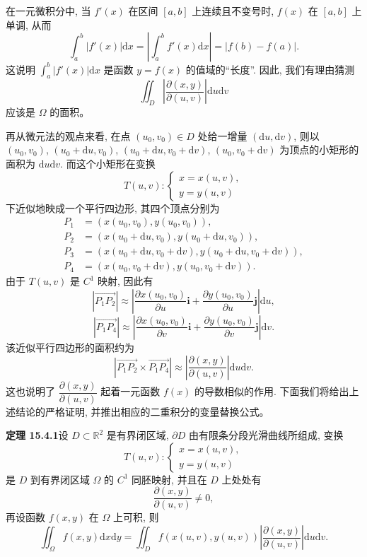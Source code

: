 \documentclass[UTF8, 12pt, fontset=fandol, oneside]{ctexart}
\begin{document}
在一元微积分中, 当 $f'(x)$ 在区间 $[a,b]$ 上连续且不变号时, $f(x)$ 在 $[a,b]$ 上单调, 从而
\[
  \int_a^b|f'(x)|\mathrm dx
  =\left|\int_a^bf'(x)\mathrm dx\right|
  =|f(b)-f(a)|.
\]
这说明 $\int_a^b|f'(x)|\mathrm dx$ 是函数 $y=f(x)$ 的值域的“长度”. 因此, 我们有理由猜测
\[
  \iint_D\left|\frac{\partial(x,y)}{\partial(u,v)}\right|\mathrm du\mathrm dv
\]
应该是 $\Omega$ 的面积。

再从微元法的观点来看, 在点 $(u_0,v_0)\in D$ 处给一增量 $(\mathrm du,\mathrm dv)$, 则以 $(u_0,v_0)$, $(u_0+\mathrm du,v_0)$, $(u_0+\mathrm du,v_0+\mathrm dv)$, $(u_0,v_0+\mathrm dv)$ 为顶点的小矩形的面积为 $\mathrm du\mathrm dv$. 而这个小矩形在变换
\[
  T(u,v):
  \begin{cases}
    x=x(u,v),\\
    y=y(u,v)
  \end{cases}
\]
下近似地映成一个平行四边形, 其四个顶点分别为
\[
\begin{aligned}
  P_1&=(x(u_0,v_0),y(u_0,v_0)),\\
  P_2&=(x(u_0+\mathrm du,v_0),y(u_0+\mathrm du,v_0)),\\
  P_3&=(x(u_0+\mathrm du,v_0+\mathrm dv),y(u_0+\mathrm du,v_0+\mathrm dv)),\\
  P_4&=(x(u_0,v_0+\mathrm dv),y(u_0,v_0+\mathrm dv)).
\end{aligned}
\]
由于 $T(u,v)$ 是 $C^1$ 映射, 因此有
\[
  |\overrightarrow{P_1P_2}|\approx
  \left|\frac{\partial x(u_0,v_0)}{\partial u}\boldsymbol i
  +\frac{\partial y(u_0,v_0)}{\partial u}\boldsymbol j\right|\mathrm du,
\]
\[
  |\overrightarrow{P_1P_4}|\approx
  \left|\frac{\partial x(u_0,v_0)}{\partial v}\boldsymbol i
  +\frac{\partial y(u_0,v_0)}{\partial v}\boldsymbol j\right|\mathrm dv.
\]
该近似平行四边形的面积约为
\[
  |\overrightarrow{P_1P_2}\times\overrightarrow{P_1P_4}|
  \approx
  \left|\frac{\partial(x,y)}{\partial(u,v)}\right|\mathrm du\mathrm dv.
\]
这也说明了 $\dfrac{\partial(x,y)}{\partial(u,v)}$ 起着一元函数 $f(x)$ 的导数相似的作用. 下面我们将给出上述结论的严格证明, 并推出相应的二重积分的变量替换公式。

\noindent\textbf{定理 15.4.1}\quad 设 $D\subset\mathbb R^2$ 是有界闭区域, $\partial D$ 由有限条分段光滑曲线所组成, 变换
\[
  T(u,v):
  \begin{cases}
    x=x(u,v),\\
    y=y(u,v)
  \end{cases}
\]
是 $D$ 到有界闭区域 $\Omega$ 的 $C^1$ 同胚映射, 并且在 $D$ 上处处有
\[
  \frac{\partial(x,y)}{\partial(u,v)}\ne0,
\]
再设函数 $f(x,y)$ 在 $\Omega$ 上可积, 则
\[
  \iint_\Omega f(x,y)\mathrm dx\mathrm dy
  =\iint_D f(x(u,v),y(u,v))
  \left|\frac{\partial(x,y)}{\partial(u,v)}\right|\mathrm du\mathrm dv.
\]
\end{document}
